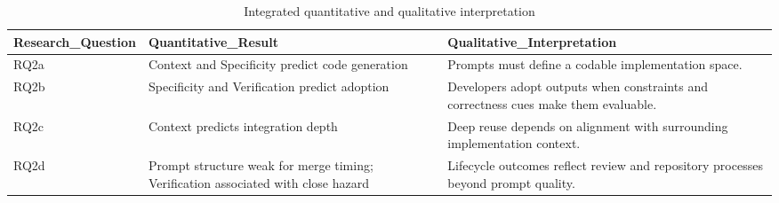 \begin{table}
\caption{Integrated quantitative and qualitative interpretation}
\label{tab:triangulation}
\begin{tabular}{lll}
\toprule
Research_Question & Quantitative_Result & Qualitative_Interpretation \\
\midrule
RQ2a & Context and Specificity predict code generation & Prompts must define a codable implementation space. \\
RQ2b & Specificity and Verification predict adoption & Developers adopt outputs when constraints and correctness cues make them evaluable. \\
RQ2c & Context predicts integration depth & Deep reuse depends on alignment with surrounding implementation context. \\
RQ2d & Prompt structure weak for merge timing; Verification associated with close hazard & Lifecycle outcomes reflect review and repository processes beyond prompt quality. \\
\bottomrule
\end{tabular}
\end{table}
